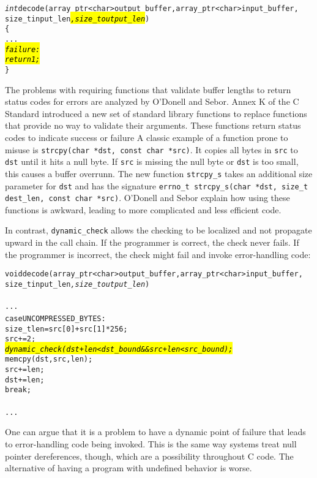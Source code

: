 \begin{alltt}
\textit{int} decode(array\_ptr<char> output\_buffer, array\_ptr<char> input\_buffer, 
            size\_t input\_len\hl{\textit{, size\_t output\_len}})
\{
   ...
\hl{\textit{   failure:}}
\hl{\textit{      return 1;}}
\}
\end{alltt}

The problems with requiring functions that validate buffer lengths to
return status codes for errors are analyzed by O'Donell and Sebor\cite{ODonell2015}. 
Annex K of the C Standard \cite{ISO2011} introduced a new set of standard library functions to replace
functions that provide no way to validate their arguments. These
functions return status codes to indicate success or failure A classic
example of a function prone to misuse is \texttt{strcpy(char *dst, const
char *src)}. It copies all bytes in \texttt{src} to \texttt{dst} until
it hits a null byte. If \texttt{src} is missing the null byte or
\texttt{dst} is too small, this causes a buffer overrunn. The new
function \texttt{strcpy\_s} takes an additional size parameter for
\texttt{dst} and has the signature \texttt{errno\_t strcpy\_s(char *dst,
size\_t dest\_len, const char *src)}. O'Donell and Sebor explain how
using these functions is awkward, leading to more complicated and less
efficient code.

In contrast, \texttt{dynamic\_check} allows the checking to be localized
and not propagate upward in the call chain. If the programmer is
correct, the check never fails. If the programmer is incorrect, the
check might fail and invoke error-handling code:

\begin{alltt}
void decode(array\_ptr<char> output\_buffer, array\_ptr<char> input\_buffer, 
            size\_t input\_len\textit{, size\_t output\_len})
{
      ...
            case UNCOMPRESSED\_BYTES: { 
                size\_t len = src[0] + src[1]*256;
                src += 2;
                \hl{\textit{dynamic\_check(dst + len < dst\_bound && src + len < src_bound);}}
                memcpy(dst, src, len);
                src += len;
                dst += len;                
                break;
            }
   ...
}
\end{alltt}

One can argue that it is a problem to have a dynamic point of failure
that leads to error-handling code being invoked. This is the same way
systems treat null pointer dereferences, though, which are a possibility
throughout C code. The alternative of having a program with undefined
behavior is worse.

